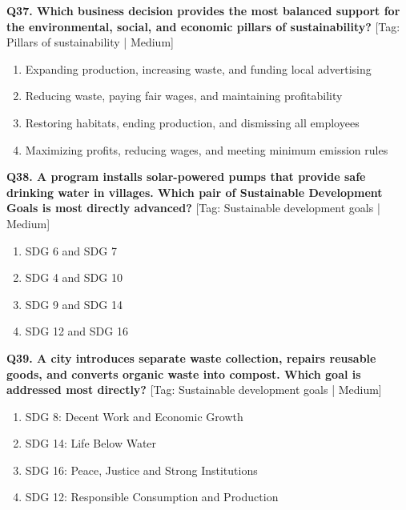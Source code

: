 \noindent\textbf{Q37. Which business decision provides the most balanced support for the environmental, social, and economic pillars of sustainability?} \hfill [Tag: Pillars of sustainability | Medium]
\begin{enumerate}[label=(\alph*),topsep=2pt,itemsep=1pt,partopsep=0pt,parsep=0pt]
    \item {Expanding production, increasing waste, and funding local advertising}
    \item {Reducing waste, paying fair wages, and maintaining profitability}
    \item {Restoring habitats, ending production, and dismissing all employees}
    \item {Maximizing profits, reducing wages, and meeting minimum emission rules}
\end{enumerate}
\vspace{2mm}

\noindent\textbf{Q38. A program installs solar-powered pumps that provide safe drinking water in villages. Which pair of Sustainable Development Goals is most directly advanced?} \hfill [Tag: Sustainable development goals | Medium]
\begin{enumerate}[label=(\alph*),topsep=2pt,itemsep=1pt,partopsep=0pt,parsep=0pt]
    \item {SDG 6 and SDG 7}
    \item {SDG 4 and SDG 10}
    \item {SDG 9 and SDG 14}
    \item {SDG 12 and SDG 16}
\end{enumerate}
\vspace{2mm}

\noindent\textbf{Q39. A city introduces separate waste collection, repairs reusable goods, and converts organic waste into compost. Which goal is addressed most directly?} \hfill [Tag: Sustainable development goals | Medium]
\begin{enumerate}[label=(\alph*),topsep=2pt,itemsep=1pt,partopsep=0pt,parsep=0pt]
    \item {SDG 8: Decent Work and Economic Growth}
    \item {SDG 14: Life Below Water}
    \item {SDG 16: Peace, Justice and Strong Institutions}
    \item {SDG 12: Responsible Consumption and Production}
\end{enumerate}
\vspace{2mm}

